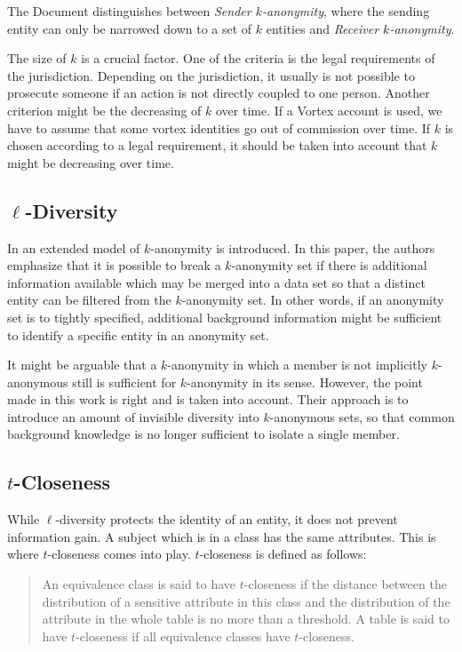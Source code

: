 The Document distinguishes between \textit{Sender $k$-anonymity}, where the sending entity can only be narrowed down to a set of $k$ entities and \textit{Receiver $k$-anonymity}. 

The size of $k$ is a crucial factor. One of the criteria is the legal requirements of the jurisdiction. Depending on the jurisdiction, it usually is not possible to prosecute someone if an action is not directly coupled to one person. Another criterion might be the decreasing of $k$ over time. If a Vortex account is used, we have to assume that some vortex identities go out of commission over time. If $k$ is chosen according to a legal requirement, it should be taken into account that $k$ might be decreasing over time.

\subsection{\texorpdfstring{$\ell$}{l}-Diversity}
In \cite{machanavajjhala2007diversity} an extended model of $k$-anonymity is introduced. In this paper, the authors emphasize that it is possible to break a $k$-anonymity set if there is additional information available which may be merged into a data set so that a distinct entity can be filtered from the $k$-anonymity set. In other words, if an anonymity set is to tightly specified, additional background information might be sufficient to identify a specific entity in an anonymity set.

It might be arguable that a $k$-anonymity in which a member is not implicitly $k$-anonymous still is sufficient for $k$-anonymity in its sense. However, the point made in this work is right and is taken into account. Their approach is to introduce an amount of invisible diversity into $k$-anonymous sets, so that common background knowledge is no longer sufficient to isolate a single member.

\subsection{\texorpdfstring{$t$}{t}-Closeness}
While $\ell$-diversity protects the identity of an entity, it does not prevent information gain. A subject which is in a class has the same attributes. This is where $t$-closeness\cite{li2007t} comes into play. $t$-closeness is defined as follows:

\begin{quote}
	An equivalence class is said to have $t$-closeness if the distance between the distribution of a sensitive attribute in this class and the distribution of the attribute in the whole table is no more than a threshold. A table is said to have $t$-closeness if all equivalence classes have $t$-closeness.
\end{quote}

